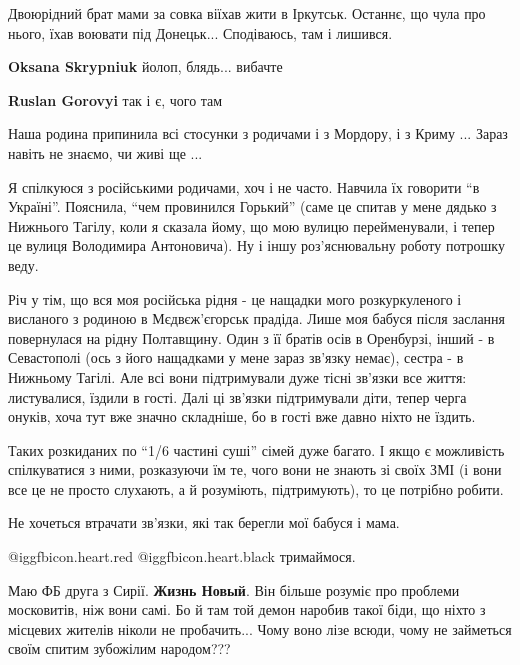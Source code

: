 \begin{itemize}
Двоюрідний брат мами за совка віїхав жити в Іркутськ. Останнє, що чула про
нього, їхав воювати під Донецьк... Сподіваюсь, там і лишився.

\begin{itemize} %
\textbf{Oksana Skrypniuk} йолоп, блядь... вибачте

\textbf{Ruslan Gorovyi} так і є, чого там
\end{itemize} %


Наша родина припинила всі стосунки з родичами і з Мордору, і з Криму ... Зараз
навіть не знаємо, чи живі ще ...


Я спілкуюся з російськими родичами, хоч і не часто. Навчила їх говорити \enquote{в
Україні}. Пояснила, \enquote{чем провинился Горький} (саме це спитав у мене дядько з
Нижнього Тагілу, коли я сказала йому, що мою вулицю перейменували, і тепер це
вулиця Володимира Антоновича). Ну і іншу роз'яснювальну роботу потрошку веду.

Річ у тім, що вся моя російська рідня - це нащадки мого розкуркуленого і
висланого з родиною в Мєдвєж'єгорськ прадіда. Лише моя бабуся після заслання
повернулася на рідну Полтавщину. Один з її братів осів в Оренбурзі, інший - в
Севастополі (ось з його нащадками у мене зараз зв'язку немає), сестра - в
Нижньому Тагілі. Але всі вони підтримували дуже тісні зв'язки все життя:
листувалися, їздили в гості. Далі ці зв'язки підтримували діти, тепер черга
онуків, хоча тут вже значно складніше, бо в гості вже давно ніхто не їздить.

Таких розкиданих по \enquote{1/6 частині суші} сімей дуже багато. І якщо є
можливість спілкуватися з ними, розказуючи їм те, чого вони не знають зі своїх
ЗМІ (і вони все це не просто слухають, а й розуміють, підтримують), то це
потрібно робити.

Не хочеться втрачати зв'язки, які так берегли мої бабуся і мама.

@igg{fbicon.heart.red} @igg{fbicon.heart.black}  тримаймося.


Маю ФБ друга з Сирії. \textbf{Жизнь Новый}. Він більше розуміє про проблеми
московитів, ніж вони самі. Бо й там той демон наробив такої біди, що ніхто з
місцевих жителів ніколи не пробачить... Чому воно лізе всюди, чому не займеться
своїм спитим зубожілим народом???


\end{itemize}
